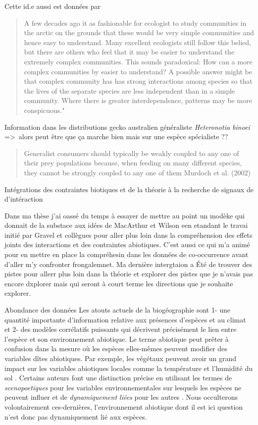 Cette id.e aussi est données par

\begin{quote}
A few decades ago it as fashionable for ecologist to study communities
in the arctic on the grounds that these would be very simple communities
and hence easy to understand. Many excellent ecologists still follow
this belied, but there are others who feel that it may be easier to
understand the extremely complex communities. This sounds paradoxical:
How can a more complex communities by easier to understand? A possible
answer might be that complex community has has strong interactions among
species so that the lives of the separate species are less independent
than in a simple community. Where there is greater interdependence,
patterns may be more conspicuous."
\end{quote}

Information dans les distributions gecko australien généraliste
\emph{Heteronotia binoei} =\textgreater{}~alors peut être que ça marche
bien mais sur une espèce spécialiste ??

\begin{quote}
Generalist consumers should typically be weakly coupled to any one of
their prey populations because, when feeding on many different species,
they cannot be strongly coupled to any one of them Murdoch et al. (2002)
\end{quote}

Intégrations des contraintes biotiques et de la théorie à la recherche
de signaux de d'intéraction

Dans ma thèse j'ai oassé du temps à essayer de mettre au point un modèke
qui donnait de la substace aux idées de MacArthur et Wilson een etandant
le travai initié par Gravel et collègues pour aller plus loin dans la
compréhension des effets joints des interactions et des contraintes
abiotiques. C'est aussi ce qui m'a animé pour en mettre en place la
compréhesin dans les données de co-occurrence avant d'aller m'y
confronter frongalemnet. Ma dernière intergtaion a Été de trouver des
pistes pour allerr plus loin dans la théorie et explorer des pistes que
je n'avais pas encore dxplorer mais qui seront à court terme les
directions que je souhaite explorer.

Abondance des données Les atouts actuels de la biogéographie sont 1- une
quantité importante d'information relative aux présences d'espèces et au
climat et 2- des modèles corrélatifs puissants qui décrivent précisément
le lien entre l'espèce et son environnement abiotique. Le terme
abiotique peut prêter à confusion dans la mesure où les espèces
elles-mêmes peuvent modifier des variables dîtes abiotiques. Par
exemple, les végétaux peuvent avoir un grand impact sur les variables
abiotiques locales comme la température et l'humidité du sol
\cite{Breshears1998}. Certains auteurs font une distinction précise en
utilisant les termes de \textit{scenopoetiques} pour les variables
environnementales sur lesquels les espèces ne peuvent influer et de
\textit{dynamiquement liées} pour les autres \cite{Peterson2011}. Nous
occulterons volontairement ces-dernières, l'environnement abiotique dont
il est ici question n'est donc pas dynamiquement lié aux espèces.

